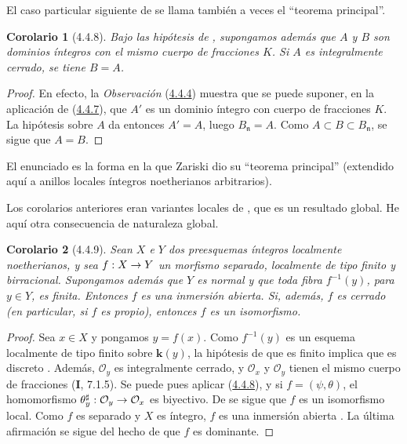 \documentclass[10pt,oneside,openany]{book}
\theoremstyle{egaenv}\newtheorem*{env}{---}
\theoremstyle{egastatement}
\newtheorem*{corollary}{Corolario}
\theoremstyle{egadescription}
\renewcommand{\to}{\mathchoice{\longrightarrow}{\rightarrow}{\rightarrow}{\rightarrow}}
\begin{document}
El caso particular siguiente de  se llama también a
veces el ``teorema principal''.

\begin{corollary}[4.4.8]
\label{III.4.4.8}
\label{III.4.4.8-fr}
Bajo las hipótesis de , supongamos además que $A$ y
$B$ son dominios íntegros con el mismo cuerpo de fracciones $K$.
Si $A$ es
integralmente cerrado, se tiene $B=A$.
\end{corollary}

\begin{proof}
En efecto, la \emph{Observación} (\hyperref[III.4.4.4-fr]{4.4.4}) muestra que se puede
suponer, en la aplicación de (\hyperref[III.4.4.7-fr]{4.4.7}), que $A'$ es un dominio íntegro con
cuerpo de fracciones $K$. La hipótesis sobre $A$ da entonces
$A'=A$, luego $B_{\mathfrak n}=A$. Como
$A\subset B\subset B_{\mathfrak n}$, se sigue que $A=B$.
\end{proof}

El enunciado  es la forma en la que Zariski dio su
``teorema principal'' (extendido aquí a anillos locales íntegros
noetherianos arbitrarios).

Los corolarios anteriores eran variantes locales de
, que es un resultado global. He aquí otra
consecuencia de naturaleza global.

\begin{corollary}[4.4.9]
\label{III.4.4.9}
\label{III.4.4.9-fr}
Sean $X$ e $Y$ dos preesquemas íntegros localmente noetherianos, y sea
$f:X\to Y$ un morfismo separado, localmente de tipo finito y birracional.
Supongamos además que $Y$ es normal y que toda fibra $f^{-1}(y)$,
para $y\in Y$, es finita. Entonces $f$ es una inmersión abierta. Si,
además, $f$ es cerrado (en particular, si $f$ es propio), entonces
$f$ es un isomorfismo.
\end{corollary}

\begin{proof}
Sea $x\in X$ y pongamos $y=f(x)$. Como $f^{-1}(y)$ es un esquema
localmente de tipo finito sobre $\boldsymbol{k}(y)$, la hipótesis de que es finito implica que
es discreto . Además, $\mathcal O_y$ es integralmente
cerrado, y $\mathcal O_x$ y $\mathcal O_y$ tienen el mismo cuerpo de fracciones (\textbf{I}, 7.1.5). Se puede pues aplicar (\hyperref[III.4.4.8-fr]{4.4.8}), y si $f=(\psi,\theta)$, el homomorfismo
$\theta_y^\sharp:\mathcal O_y\to\mathcal O_x$
es biyectivo. De  se sigue que $f$ es un isomorfismo
local. Como $f$ es separado y $X$ es íntegro, $f$ es una inmersión
abierta . La última afirmación se sigue del hecho de
que $f$ es dominante.
\end{proof}
\end{document}
